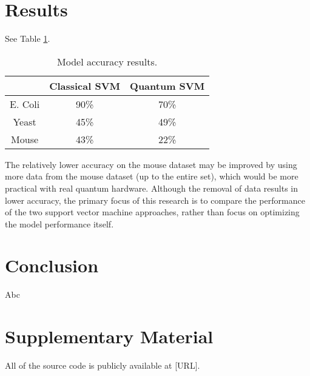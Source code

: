 \documentclass{article}
\begin{document}
\section{Results}
    See Table \ref{table:accuracy}.

    \begin{table}[h]
      \centering
      \begin{tabular}{c|c|c|}
      \cline{2-3}
                                    & Classical SVM & Quantum SVM \\ \hline
      \multicolumn{1}{|c|}{E. Coli} & 90\%          & 70\%        \\ \hline
      \multicolumn{1}{|c|}{Yeast}   & 45\%          & 49\%        \\ \hline
      \multicolumn{1}{|c|}{Mouse}   & 43\%          & 22\%        \\ \hline
      \end{tabular}
      \caption{\label{table:accuracy}Model accuracy results.}
    \end{table}

    The relatively lower accuracy on the mouse dataset may be improved by using more data from the mouse dataset (up to the entire set), which would be more practical with real quantum hardware. Although the removal of data results in lower accuracy, the primary focus of this research is to compare the performance of the two support vector machine approaches, rather than focus on optimizing the model performance itself.

\section{Conclusion}
  Abc

\section{Supplementary Material}
All of the source code is publicly available at [URL].

\newpage

\raggedright

\end{document}
